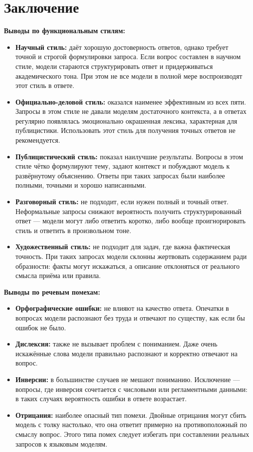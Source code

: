 \documentclass[a4paper, final]{article}
\begin{document}
\newpage

\section*{Заключение}

\textbf{Выводы по функциональным стилям:}
\begin{itemize}
    \item \textbf{Научный стиль:} даёт хорошую достоверность ответов, однако требует точной и строгой формулировки запроса. Если вопрос составлен в научном стиле, модели стараются структурировать ответ и придерживаться академического тона. При этом не все модели в полной мере воспроизводят этот стиль в ответе.
    \item \textbf{Официально-деловой стиль:} оказался наименее эффективным из всех пяти. Запросы в этом стиле не давали моделям достаточного контекста, а в ответах регулярно появлялась эмоционально окрашенная лексика, характерная для публицистики. Использовать этот стиль для получения точных ответов не рекомендуется.
    \item \textbf{Публицистический стиль:} показал наилучшие результаты. Вопросы в этом стиле чётко формулируют тему, задают контекст и побуждают модель к развёрнутому объяснению. Ответы при таких запросах были наиболее полными, точными и хорошо написанными.
    \item \textbf{Разговорный стиль:} не подходит, если нужен полный и точный ответ. Неформальные запросы снижают вероятность получить структурированный ответ — модели могут либо ответить коротко, либо вообще проигнорировать стиль и ответить в произвольном тоне.
    \item \textbf{Художественный стиль:} не подходит для задач, где важна фактическая точность. При таких запросах модели склонны жертвовать содержанием ради образности: факты могут искажаться, а описание отклоняться от реального смысла приёма или правила.
\end{itemize}

\vspace{1em}
\textbf{Выводы по речевым помехам:}
\begin{itemize}
    \item \textbf{Орфографические ошибки:} не влияют на качество ответа. Опечатки в вопросах модели распознают без труда и отвечают по существу, как если бы ошибок не было.
    \item \textbf{Дислексия:} также не вызывает проблем с пониманием. Даже очень искажённые слова модели правильно распознают и корректно отвечают на вопрос.
    \item \textbf{Инверсии:} в большинстве случаев не мешают пониманию. Исключение — вопросы, где инверсия сочетается с числовыми или регламентными данными: в таких случаях вероятность ошибки в ответе возрастает.
    \item \textbf{Отрицания:} наиболее опасный тип помехи. Двойные отрицания могут сбить модель с толку настолько, что она ответит примерно на противоположный по смыслу вопрос. Этого типа помех следует избегать при составлении реальных запросов к языковым моделям.
\end{itemize}
\end{document}
